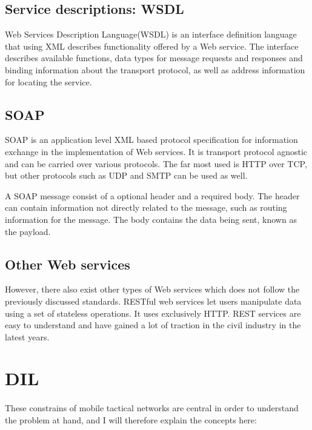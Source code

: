 \documentclass[USenglish]{article}
\begin{document}
\subsection{Service descriptions: WSDL}
Web Services Description Language(WSDL) is an interface definition language that using XML describes functionality offered by a Web service. The interface describes available functions, data types for message requests and responses and binding information about the transport protocol, as well as address information for locating the service. 

\subsection{SOAP}
SOAP is an application level XML based protocol specification for information exchange in the implementation of Web services. It is transport protocol agnostic and can be carried over various protocols. The far most used is HTTP over TCP, but other protocols such as UDP and SMTP can be used as well.  

A SOAP message consist of a optional header and a required body. The header can contain information not directly related to the message, such as routing information for the message. The body contains the data being sent, known as the payload.

\subsection{Other Web services}
However, there also exist other types of Web services which does not follow the previously discussed standards. RESTful web services let users manipulate data using a set of stateless operations. It uses exclusively HTTP. REST services are easy to understand and have gained a lot of traction in the civil industry in the latest years.



\section{DIL}
\label{dil}
\paragraph{}
These constrains of mobile tactical networks are central in order to understand the problem at hand, and I will therefore explain the concepts here:
\end{document}
